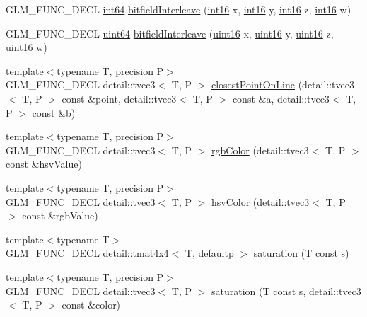\begin{CompactItemize}
\item 
GLM\_\-FUNC\_\-DECL \hyperlink{group__gtc__type__precision_g435d75819cce297cc5fa21bd84ef89a5}{int64} \hyperlink{group__gtx__bit_g09ee0be0fac790a1607a711e597dd9bf}{bitfieldInterleave} (\hyperlink{group__gtc__type__precision_g2945a61d12771f8954994fcddf02b021}{int16} x, \hyperlink{group__gtc__type__precision_g2945a61d12771f8954994fcddf02b021}{int16} y, \hyperlink{group__gtc__type__precision_g2945a61d12771f8954994fcddf02b021}{int16} z, \hyperlink{group__gtc__type__precision_g2945a61d12771f8954994fcddf02b021}{int16} w)
\item 
GLM\_\-FUNC\_\-DECL \hyperlink{group__gtc__type__precision_ge3632bf9b37da66233d78930dd06378a}{uint64} \hyperlink{group__gtx__bit_gc8a926a7bfd9b23c22a4f685193fbfe1}{bitfieldInterleave} (\hyperlink{group__gtc__type__precision_gd8c2939e1fdd8e5828b31d95c52255d5}{uint16} x, \hyperlink{group__gtc__type__precision_gd8c2939e1fdd8e5828b31d95c52255d5}{uint16} y, \hyperlink{group__gtc__type__precision_gd8c2939e1fdd8e5828b31d95c52255d5}{uint16} z, \hyperlink{group__gtc__type__precision_gd8c2939e1fdd8e5828b31d95c52255d5}{uint16} w)
\item 
{\footnotesize template$<$typename T, precision P$>$ }\\GLM\_\-FUNC\_\-DECL detail::tvec3$<$ T, P $>$ \hyperlink{group__gtx__closest__point_g2fe2729eb32015953823c96c2e15daf9}{closestPointOnLine} (detail::tvec3$<$ T, P $>$ const \&point, detail::tvec3$<$ T, P $>$ const \&a, detail::tvec3$<$ T, P $>$ const \&b)
\item 
{\footnotesize template$<$typename T, precision P$>$ }\\GLM\_\-FUNC\_\-DECL detail::tvec3$<$ T, P $>$ \hyperlink{group__gtx__color__space_g35a9210371395c95b185f5aac6c0020e}{rgbColor} (detail::tvec3$<$ T, P $>$ const \&hsvValue)
\item 
{\footnotesize template$<$typename T, precision P$>$ }\\GLM\_\-FUNC\_\-DECL detail::tvec3$<$ T, P $>$ \hyperlink{group__gtx__color__space_g2532e85174ba333c4f60127d03d71655}{hsvColor} (detail::tvec3$<$ T, P $>$ const \&rgbValue)
\item 
{\footnotesize template$<$typename T$>$ }\\GLM\_\-FUNC\_\-DECL detail::tmat4x4$<$ T, defaultp $>$ \hyperlink{group__gtx__color__space_g53a08c053e194bad0bfc172ef950bfe7}{saturation} (T const s)
\item 
{\footnotesize template$<$typename T, precision P$>$ }\\GLM\_\-FUNC\_\-DECL detail::tvec3$<$ T, P $>$ \hyperlink{group__gtx__color__space_gc45433ff3d2f2f3657edfcf9ee24800d}{saturation} (T const s, detail::tvec3$<$ T, P $>$ const \&color)

\end{CompactItemize}
